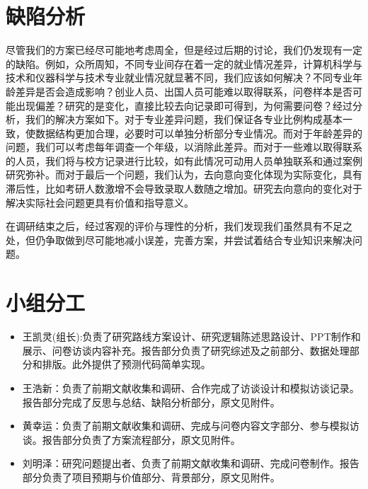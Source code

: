 \documentclass[a4paper]{IEEEtran}
\begin{document}
		\section{缺陷分析}
		尽管我们的方案已经尽可能地考虑周全，但是经过后期的讨论，我们仍发现有一定的缺陷。例如，众所周知，不同专业间存在着一定的就业情况差异，计算机科学与技术和仪器科学与技术专业就业情况就显著不同，我们应该如何解决？不同专业年龄差异是否会造成影响？创业人员、出国人员可能难以取得联系，问卷样本是否可能出现偏差？研究的是变化，直接比较去向记录即可得到，为何需要问卷？经过分析，我们的解决方案如下。对于专业差异问题，我们保证各专业比例构成基本一致，使数据结构更加合理，必要时可以单独分析部分专业情况。而对于年龄差异的问题，我们可以考虑每年调查一个年级，以消除此差异。而对于一些难以取得联系的人员，我们将与校方记录进行比较，如有此情况可动用人员单独联系和通过案例研究弥补。而对于最后一个问题，我们认为，去向意向变化体现为实际变化，具有滞后性，比如考研人数激增不会导致录取人数随之增加。研究去向意向的变化对于解决实际社会问题更具有价值和指导意义。
		
		在调研结束之后，经过客观的评价与理性的分析，我们发现我们虽然具有不足之处，但仍争取做到尽可能地减小误差，完善方案，并尝试着结合专业知识来解决问题。
		
		\section{小组分工}
		\begin{itemize}
			\item 王凯灵(组长):负责了研究路线方案设计、研究逻辑陈述思路设计、PPT制作和展示、问卷访谈内容补充。报告部分负责了研究综述及之前部分、数据处理部分和排版。此外提供了预测代码简单实现。
			\item 王浩新：负责了前期文献收集和调研、合作完成了访谈设计和模拟访谈记录。报告部分完成了反思与总结、缺陷分析部分，原文见附件。
			\item 黄幸运：负责了前期文献收集和调研、完成与问卷内容文字部分、参与模拟访谈。报告部分负责了方案流程部分，原文见附件。
			\item 刘明泽：研究问题提出者、负责了前期文献收集和调研、完成问卷制作。报告部分负责了项目预期与价值部分、背景部分，原文见附件。
		\end{itemize}
\end{document}
